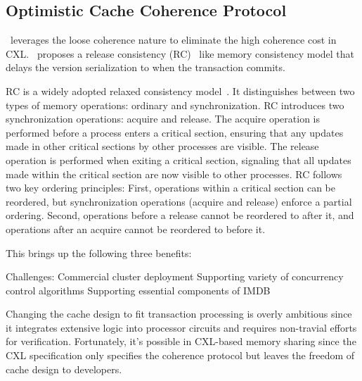 \ifx\stale\undefined
\subsection{Optimistic Cache Coherence Protocol}



\name~leverages the loose coherence nature to eliminate the high coherence cost in CXL. \name~proposes a release consistency (RC)~\cite{rc} like memory consistency model that delays the version serialization to when the transaction commits. 

RC is a widely adopted relaxed consistency model~\cite{threadmark, munin, txcache}. It distinguishes between two types of memory operations: ordinary and synchronization. RC introduces two synchronization operations: acquire and release. The acquire operation is performed before a process enters a critical section, ensuring that any updates made in other critical sections by other processes are visible. The release operation is performed when exiting a critical section, signaling that all updates made within the critical section are now visible to other processes. 
RC follows two key ordering principles: 
First, operations within a critical section can be reordered, but synchronization operations (acquire and release) enforce a partial ordering. Second, operations before a release cannot be reordered to after it, and operations after an acquire cannot be reordered to before it.


This brings up the following three benefits: 

Challenges: 
Commercial cluster deployment
Supporting variety of concurrency control algorithms
Supporting essential components of IMDB

Changing the cache design to fit transaction processing is overly ambitious since it integrates extensive logic into processor circuits and requires non-travial efforts for verification. Fortunately, it's possible in CXL-based memory sharing since the CXL specification only specifies the coherence protocol but leaves the freedom of cache design to developers. 
\fi



